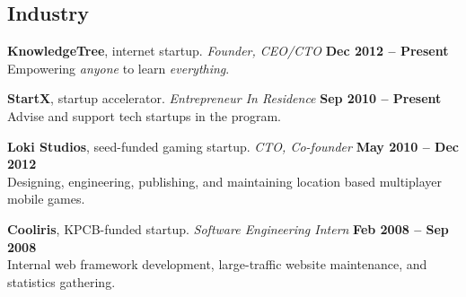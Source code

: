 \documentclass[margin,line]{resume}
\begin{document}
\begin{resume}





    \section{\mysidestyle Industry}

    \textbf{KnowledgeTree}, internet startup.
        \textsl{Founder, CEO/CTO}
        \hfill \textbf{Dec 2012 -- Present}\\
    Empowering \textsl{anyone} to learn \textsl{everything}.

    \textbf{StartX}, startup accelerator.
        \textsl{Entrepreneur In Residence}
        \hfill \textbf{Sep 2010 -- Present}\\
    Advise and support tech startups in the program.

    \textbf{Loki Studios}, seed-funded gaming startup.
        \textsl{CTO, Co-founder}
        \hfill \textbf{May 2010 -- Dec 2012}\\
    Designing, engineering, publishing, and maintaining location based
    multiplayer mobile games.

    \textbf{Cooliris}, KPCB-funded startup.
          \textsl{Software Engineering Intern}
          \hfill \textbf{Feb 2008 -- Sep 2008}\\
    Internal web framework development, large-traffic website maintenance,
    and statistics gathering.


\end{resume}
\end{document}
